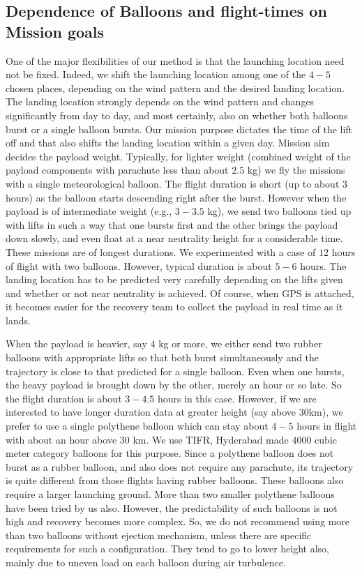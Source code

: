 \subsection{Dependence of Balloons and flight-times on Mission goals}
\label{ssec:carr}
One of the major flexibilities of our method is that the launching location 
need not be fixed. Indeed, we shift the launching location among one of the $4-5$
chosen places, depending on the wind pattern and the desired landing location.
The landing location strongly depends on the wind pattern and changes 
significantly from day to day, and most certainly, also on whether both balloons burst 
or a single balloon bursts. Our mission purpose dictates the time of the lift off
and that also shifts the landing location within a given day. Mission aim
decides the payload weight. Typically, for lighter weight (combined weight of 
the payload components with parachute less than about $2.5$ kg) we fly the
missions with a single meteorological balloon. The flight duration is short 
(up to about $3$ hours) as the balloon starts descending right after the burst. 
However when the payload is of intermediate weight (e.g., $3-3.5$ kg), we send 
two balloons tied up with lifts in such a way that 
one bursts first and the other brings the payload down slowly, and even float at a 
near neutrality height for a considerable time. These missions are of longest
durations. We experimented with a case of $12$ hours of flight with two balloons. 
However, typical duration is about $5-6$ hours. The landing location has to be predicted
very carefully depending on the lifts given and whether or not near neutrality is
achieved. Of course, when GPS is attached, it becomes easier for the recovery team to
collect the payload in real time as it lands. 

When the payload is heavier, say $4$ kg or more, we either send two rubber balloons with 
appropriate lifts so that both burst simultaneously and the trajectory is close to that
predicted for a single balloon. Even when one bursts, the heavy payload is brought
down by the other, merely an hour or so late. So the flight duration is about $3-4.5$ hours
in this case. However, if we are interested to have longer duration data at 
greater height (say above 30km), we prefer to use a single polythene balloon which can
stay about $4-5$ hours in flight with about an hour above $30$ km. We use TIFR, Hyderabad
made $4000$ cubic meter category balloons for this purpose. Since a polythene balloon 
does not burst as a rubber balloon, and also does not require any parachute, 
its trajectory is quite different from those flights having rubber balloons. These balloons also 
require a larger launching ground. More than two smaller 
polythene balloons have been tried by us also. However, the predictability of 
such balloons is not high and recovery becomes more complex. So, we do not recommend 
using more than two balloons without ejection mechanism, unless there are 
specific requirements for such a configuration. They tend to go to lower height also, mainly due to 
uneven load on each balloon during air turbulence.

